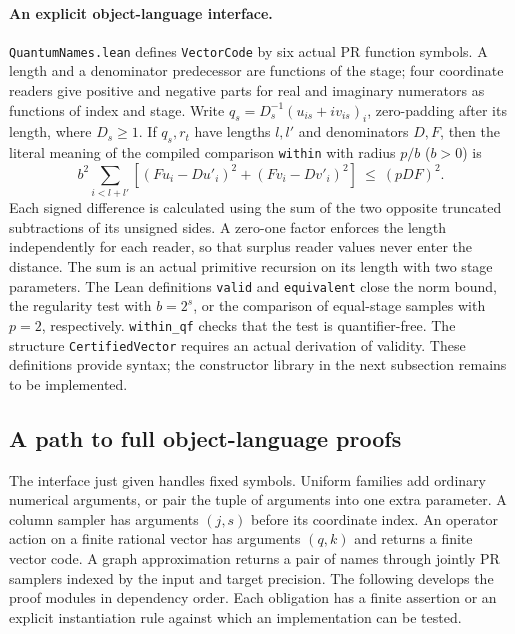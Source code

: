\paragraph{An explicit object-language interface.}
\texttt{QuantumNames.lean} defines \texttt{VectorCode} by six actual PR function symbols. A length and a denominator predecessor are functions of the stage; four coordinate readers give positive and negative parts for real and imaginary numerators as functions of index and stage. Write $q_s=D_s^{-1}(u_{is}+iv_{is})_i$, zero-padding after its length, where $D_s\ge1$. If $q_s,r_t$ have lengths $l,l'$ and denominators $D,F$, then the literal meaning of the compiled comparison \texttt{within} with radius $p/b$ ($b>0$) is
\[
 b^2\sum_{i<l+l'}\!\left[(Fu_i-Du'_i)^2+(Fv_i-Dv'_i)^2\right]\ \le\ (pDF)^2.
\]
Each signed difference is calculated using the sum of the two opposite truncated subtractions of its unsigned sides. A zero-one factor enforces the length independently for each reader, so that surplus reader values never enter the distance. The sum is an actual primitive recursion on its length with two stage parameters. The Lean definitions \texttt{valid} and \texttt{equivalent} close the norm bound, the regularity test with $b=2^s$, or the comparison of equal-stage samples with $p=2$, respectively. \texttt{within\_qf} checks that the test is quantifier-free. The structure \texttt{CertifiedVector} requires an actual derivation of validity. These definitions provide syntax; the constructor library in the next subsection remains to be implemented.

\subsection{A path to full object-language proofs}
The interface just given handles fixed symbols. Uniform families add ordinary numerical arguments, or pair the tuple of arguments into one extra parameter. A column sampler has arguments $(j,s)$ before its coordinate index. An operator action on a finite rational vector has arguments $(q,k)$ and returns a finite vector code. A graph approximation returns a pair of names through jointly PR samplers indexed by the input and target precision. The following develops the proof modules in dependency order. Each obligation has a finite assertion or an explicit instantiation rule against which an implementation can be tested.

